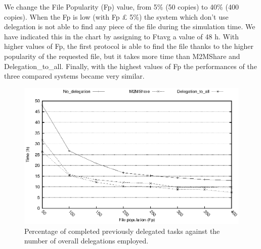 We change the File Popularity (Fp) value, from 5\% (50 copies) to 40\% (400 copies). When the Fp is low (with Fp £ 5\%) the system which don't use delegation is not able to find any piece of the file during the simulation time. We have indicated this in the chart by assigning to Ftavg a value of 48 h. With higher values of Fp, the first protocol is able to find the file thanks to the higher popularity of the requested file, but it takes more time than M2MShare and Delegation\_to\_all. Finally, with the highest values of Fp the performances of the three compared systems became very similar. 
\begin{figure}[ht]
  \begin{center}
    \includegraphics[scale=0.5]{grafici/tempiVFDiversaPop.eps}
    \caption{Percentage of completed previously delegated tasks against the number of overall delegations employed.}
    \label{graficoPopVariabile}
  \end{center}
\end{figure}


\newpage

